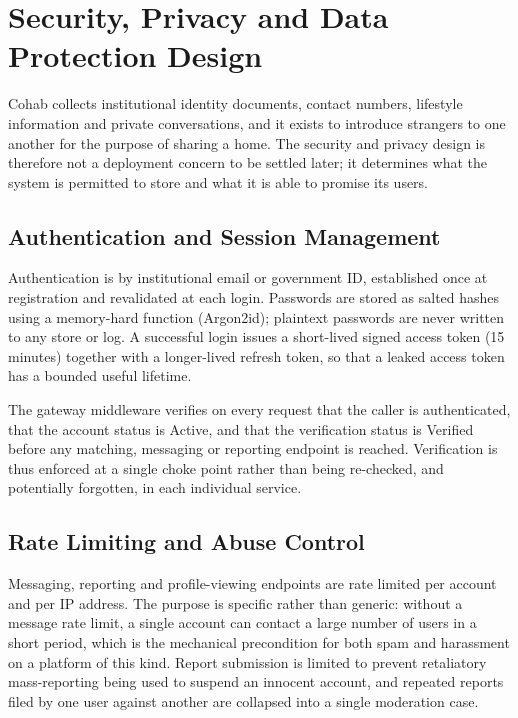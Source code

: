 \documentclass[12pt,a4paper]{report}
\begin{document}
\chapter{Security, Privacy and Data Protection Design}

Cohab collects institutional identity documents, contact numbers, lifestyle information and private conversations, and it exists to introduce strangers to one another for the purpose of sharing a home. The security and privacy design is therefore not a deployment concern to be settled later; it determines what the system is permitted to store and what it is able to promise its users.

\section{Authentication and Session Management}

Authentication is by institutional email or government ID, established once at registration and revalidated at each login. Passwords are stored as salted hashes using a memory-hard function (Argon2id); plaintext passwords are never written to any store or log. A successful login issues a short-lived signed access token (15 minutes) together with a longer-lived refresh token, so that a leaked access token has a bounded useful lifetime.

The gateway middleware verifies on every request that the caller is authenticated, that the account status is Active, and that the verification status is Verified before any matching, messaging or reporting endpoint is reached. Verification is thus enforced at a single choke point rather than being re-checked, and potentially forgotten, in each individual service.

\section{Rate Limiting and Abuse Control}

Messaging, reporting and profile-viewing endpoints are rate limited per account and per IP address. The purpose is specific rather than generic: without a message rate limit, a single account can contact a large number of users in a short period, which is the mechanical precondition for both spam and harassment on a platform of this kind. Report submission is limited to prevent retaliatory mass-reporting being used to suspend an innocent account, and repeated reports filed by one user against another are collapsed into a single moderation case.
\end{document}
